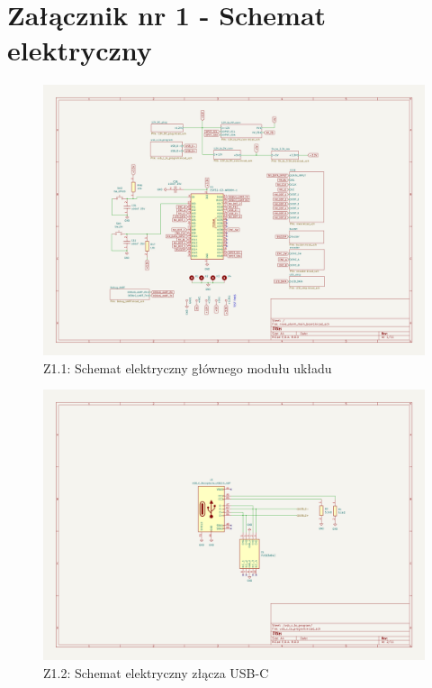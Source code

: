 \documentclass[twoside]{article}
\numberwithin{equation}{section}
\begin{document}
\printbibliography[]
\newpage
\listoffigures
{}
\newpage
\listoftables
{}

\newpage
{}

\section*{Załącznik nr 1 - Schemat elektryczny}
\thispagestyle{empty}
\begin{figure}[H]
    \centering
    \includegraphics[width=1.5\textwidth, angle=90]{zalaczniki/1.png}
    \caption*{Z1.1: Schemat elektryczny głównego modułu układu}
\end{figure}

\newpage
\thispagestyle{empty}
\begin{figure}[H]
    \centering
    \includegraphics[width=1.5\textwidth, angle=90]{zalaczniki/2.png}
    \caption*{Z1.2: Schemat elektryczny złącza USB-C}
\end{figure}
\end{document}
